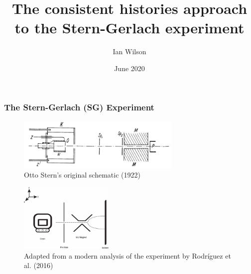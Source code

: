 \documentclass{beamer}
\title{The consistent histories approach to the Stern-Gerlach experiment}
\author{Ian Wilson}
\institute{Oregon State University}
\date{June 2020}
\begin{document}
\frame{\titlepage}

\begin{frame}
\frametitle{The Stern-Gerlach (SG) Experiment}

\begin{figure}
\includegraphics[width=0.7\textwidth]{Figure-stern}
\caption{Otto Stern's original schematic (1922)}
\end{figure}

\begin{figure}
\includegraphics[width=0.4\textwidth]{Figure-new-stern}
\caption{Adapted from a modern analysis of the experiment by Rodríguez et al. (2016)}
\end{figure}
\end{frame}
\end{document}
